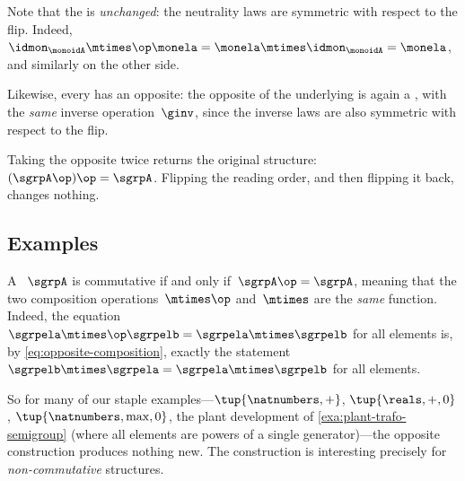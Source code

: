 \begin{remark}
    Note that the  is \emph{unchanged}: the neutrality laws are symmetric with respect to the flip.
    Indeed, $\idmon_\monoidA \mtimes\op \monela = \monela \mtimes \idmon_\monoidA = \monela$, and similarly on the other side.
\end{remark}

\begin{remark}
    Likewise, every  has an opposite: the opposite of the underlying  is again a , with the \emph{same} inverse operation~$\ginv$, since the inverse laws are also symmetric with respect to the flip.
\end{remark}

\begin{remark}
    \label{rem:opposite-involution}
    Taking the opposite twice returns the original structure: $(\sgrpA\op)\op = \sgrpA$.
    Flipping the reading order, and then flipping it back, changes nothing.
\end{remark}

\subsection{Examples}

\begin{example}
    \label{exa:opposite-commutative}
    A ~$\sgrpA$ is commutative if and only if~$\sgrpA\op = \sgrpA$, meaning that the two composition operations~$\mtimes\op$ and~$\mtimes$ are the \emph{same} function.
    Indeed, the equation~$\sgrpela \mtimes\op \sgrpelb = \sgrpela \mtimes \sgrpelb$ for all elements is, by \cref{eq:opposite-composition}, exactly the statement~$\sgrpelb \mtimes \sgrpela = \sgrpela \mtimes \sgrpelb$ for all elements.

    So for many of our staple examples---$\tup{\natnumbers, +}$, $\tup{\reals, +, 0}$, $\tup{\natnumbers, \max, 0}$, the plant development  of \cref{exa:plant-trafo-semigroup} (where all elements are powers of a single generator)---the opposite construction produces nothing new.
    The construction is interesting precisely for \emph{non-commutative} structures.
\end{example}

